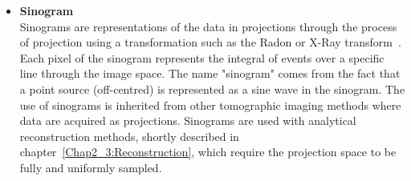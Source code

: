 \begin{itemize}
\item\textbf{Sinogram}\\
Sinograms are representations of the data in projections through the process of projection using a transformation such as the Radon or X-Ray transform~\cite{Natterer1986}. Each pixel of the sinogram represents the integral of events over a specific line through the image space. The name "sinogram" comes from the fact that a point source (off-centred) is represented as a sine wave in the sinogram.
The use of sinograms is inherited from other tomographic imaging methods where data are acquired as projections. Sinograms are used with analytical reconstruction methods, shortly described in chapter~\ref{Chap2_3:Reconstruction}, which require the projection space to be fully and uniformly sampled.
%
%
\end{itemize}

